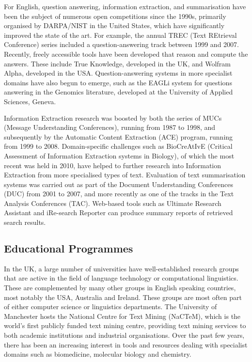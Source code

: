 \documentclass[]{../../metanetpaper}
\begin{document}
\begin{multicols}{2}
For English, question answering, information extraction, and summarisation have been the subject of numerous open competitions since the 1990s, primarily organised by DARPA/NIST in the United States, which have significantly improved the state of the art.  For example, the annual TREC (Text REtrieval Conference) series included a question-answering track between 1999 and 2007. Recently, freely accessible tools have been developed that reason and compute the answers. These include True Knowledge, developed in the UK, and Wolfram Alpha, developed in the USA. Question-answering systems in more specialist domains have also begun to emerge, such as the EAGLi system for questions answering in the Genomics literature, developed at the University of Applied Sciences, Geneva.
   
Information Extraction research was boosted by both the series of MUCs (Message Understanding Conferences), running from 1987 to 1998, and subsequently by the Automatic Content Extraction (ACE) program, running from 1999 to 2008. Domain-specific challenges such as BioCreAtIvE (Critical Assessment of Information Extraction systems in Biology), of which the most recent was held in 2010, have helped to further research into Information Extraction from more specialised types of text. Evaluation of text summarisation systems was carried out as part of the Document Understanding Conferences (DUC) from 2001 to 2007, and more recently as one of the tracks in the Text Analysis Conferences (TAC).  Web-based tools such as Ultimate Research Assistant and iRe-search Reporter can produce summary reports of retrieved search results.

\subsection{Educational Programmes}

In the UK, a large number of universities have well-established research groups that are active in the field of language technology or computational linguistics. These are complemented by many other groups in English speaking countries, most notably the USA, Australia and Ireland. These groups are most often part of either computer science or linguistics departments. The University of Manchester hosts the National Centre for Text Mining (NaCTeM), which is the world's first publicly funded text mining centre, providing text mining services to both academic institutions and industrial organisations. Over the past few years, there has been an increasing interest in tools and resources dealing with specialist domains such as biomedicine, molecular biology and chemistry. 


\end{multicols}
\end{document}
